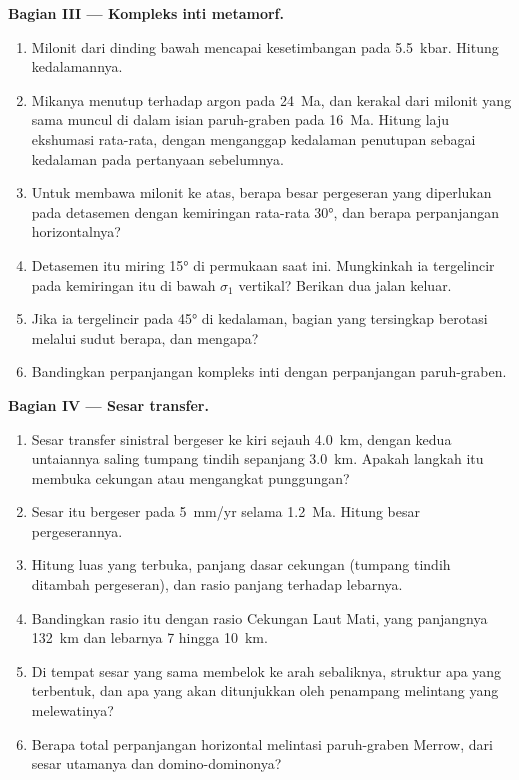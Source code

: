 \begin{problem}
\medskip\noindent\textbf{Bagian III --- Kompleks inti metamorf.}
\begin{enumerate}[resume]
  \item Milonit dari dinding bawah mencapai kesetimbangan pada \qty{5.5}{kbar}. Hitung
        kedalamannya.
  \item Mikanya menutup terhadap argon pada \qty{24}{Ma}, dan kerakal dari milonit yang sama
        muncul di dalam isian paruh-graben pada \qty{16}{Ma}. Hitung
        laju ekshumasi rata-rata, dengan menganggap kedalaman penutupan sebagai kedalaman
        pada pertanyaan sebelumnya.
  \item Untuk membawa milonit ke atas, berapa besar pergeseran yang diperlukan pada detasemen
        dengan kemiringan rata-rata \ang{30}, dan berapa perpanjangan horizontalnya?
  \item Detasemen itu miring \ang{15} di permukaan saat ini. Mungkinkah ia tergelincir pada kemiringan itu di bawah
        $\sigma_1$ vertikal? Berikan dua jalan keluar.
  \item Jika ia tergelincir pada \ang{45} di kedalaman, bagian yang tersingkap
        berotasi melalui sudut berapa, dan mengapa?
  \item Bandingkan perpanjangan kompleks inti dengan perpanjangan
        paruh-graben.
\end{enumerate}

\medskip\noindent\textbf{Bagian IV --- Sesar transfer.}
\begin{enumerate}[resume]
  \item Sesar transfer sinistral bergeser ke kiri sejauh \qty{4.0}{km}, dengan kedua untaiannya
        saling tumpang tindih sepanjang \qty{3.0}{km}. Apakah langkah itu membuka cekungan
        atau mengangkat punggungan?
  \item Sesar itu bergeser pada \qty{5}{mm/yr} selama \qty{1.2}{Ma}. Hitung
        besar pergeserannya.
  \item Hitung luas yang terbuka, panjang dasar cekungan (tumpang tindih ditambah
        pergeseran), dan rasio panjang terhadap lebarnya.
  \item Bandingkan rasio itu dengan rasio Cekungan Laut Mati, yang panjangnya \qty{132}{km} dan
        lebarnya 7 hingga \qty{10}{km}.
  \item Di tempat sesar yang sama membelok ke arah sebaliknya, struktur apa yang terbentuk, dan
        apa yang akan ditunjukkan oleh penampang melintang yang melewatinya?
  \item Berapa total perpanjangan horizontal melintasi paruh-graben Merrow,
        dari sesar utamanya dan domino-dominonya?
\end{enumerate}
\end{problem}
